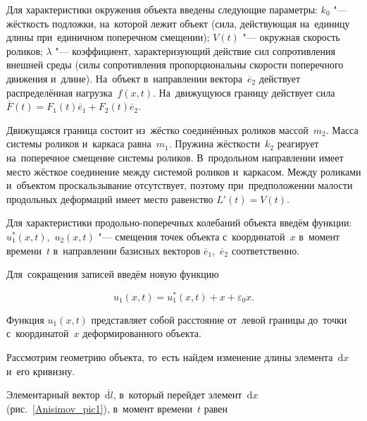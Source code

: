Для характеристики окружения объекта введены следующие параметры: $k_0$ "---  жёсткость подложки, на~которой лежит объект (сила, действующая на~единицу длины при~единичном поперечном смещении); $V(t)$ "---  окружная скорость роликов; $\lambda$ "---  коэффициент, характеризующий действие сил сопротивления внешней среды (силы сопротивления пропорциональны скорости поперечного движения и~длине). На~объект в~направлении вектора~$\overline{e}_2$ действует распределённая нагрузка~$f( x,  t )$. На~движущуюся границу действует сила $\overline{F}(t)=F_1(t)\overline{e}_1+F_2(t)\overline{e}_2$.



Движущаяся граница состоит из~жёстко соединённых роликов массой~$m_2$. Масса системы роликов и~каркаса равна~$m_1$. Пружина жёсткости~$k_2$ реагирует на~поперечное смещение системы роликов. В~продольном направлении имеет место жёсткое соединение между системой роликов и~каркасом. Между роликами и~объектом проскальзывание отсутствует, поэтому при~предположении малости продольных деформаций имеет место равенство $L'(t)=V(t)$.



Для характеристики продольно-поперечных колебаний объекта введём функции: $u_1^{*}( x,  t )$,~$u_2( x,  t )$ "---  смещения точек объекта с~координатой~$x$  в~момент времени~$t$ в~направлении базисных векторов $\overline{e}_1$,~$\overline{e}_2$ соответственно.



Для~сокращения записей введём новую функцию

\begin{equation}\label{Anisimov_eq1}

u_1( x,  t )=u_1^{*}( x,  t )+x+\varepsilon_0x.

\end{equation}

Функция $u_1( x,  t )$ представляет собой расстояние от~левой границы до~точки с~координатой~$x$ деформированного объекта.



\smallskip



 Рассмотрим геометрию объекта, то~есть найдем изменение длины элемента~$\mathrm{d}x$ и~его кривизну.



Элементарный вектор~$\overline{\mathrm{d}l}$, в~который перейдет элемент~$\mathrm{d}x$ (рис.~\ref{Anisimov_pic1}),  в~момент времени~$t$ равен 

